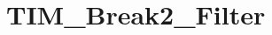 \hypertarget{group___t_i_m___break2___filter}{\section{T\-I\-M\-\_\-\-Break2\-\_\-\-Filter}
\label{group___t_i_m___break2___filter}
}
